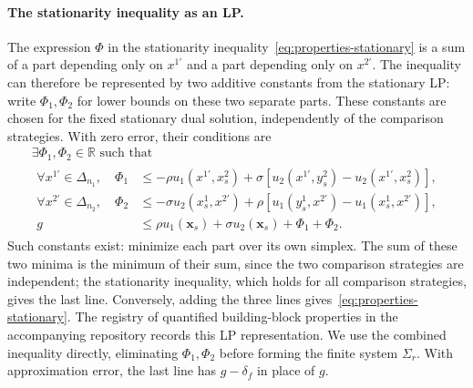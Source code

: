 \documentclass[11pt]{article}
\theoremstyle{remark}
\theoremstyle{plain}
\begin{document}
\paragraph{The stationarity inequality as an LP.}
The expression $\Phi$ in the stationarity
inequality~\eqref{eq:properties-stationary} is a sum of a part
depending only on $x^{1\prime}$ and a part depending only on
$x^{2\prime}$. The inequality can therefore be
represented by two additive constants from the stationary LP:
write $\Phi_1,\Phi_2$ for lower bounds on these two separate
parts. These constants are chosen for the fixed stationary dual
solution, independently of the comparison strategies. With zero
error, their conditions are
\begin{equation}
 \begin{gathered}
 \exists \Phi_1,\Phi_2\in\mathbb R\text{ such that}\\
 \begin{aligned}
 \forall x^{1\prime}\in\Delta_{n_1},\quad
 \Phi_1&\le-\rho u_1(x^{1\prime},x_s^2)
       +\sigma[u_2(x^{1\prime},y_s^2)-u_2(x^{1\prime},x_s^2)],\\
 \forall x^{2\prime}\in\Delta_{n_2},\quad
 \Phi_2&\le-\sigma u_2(x_s^1,x^{2\prime})
       +\rho[u_1(y_s^1,x^{2\prime})-u_1(x_s^1,x^{2\prime})],\\
 g&\le\rho u_1(\boldsymbol x_s)+\sigma u_2(\boldsymbol x_s)+\Phi_1+\Phi_2.
 \end{aligned}
 \end{gathered}
 \label{eq:stationary-lp-offsets}
\end{equation}
Such constants exist: minimize each part over its own
simplex. The sum of these two minima is the minimum of their sum,
since the two comparison strategies are independent; the
stationarity inequality, which holds for all comparison strategies,
gives the last line. Conversely, adding the
three lines gives~\eqref{eq:properties-stationary}.
The registry of quantified building-block properties in the
accompanying repository records this LP representation. We use the
combined inequality directly, eliminating $\Phi_1,\Phi_2$ before forming
the finite system $\Sigma_r$. With approximation error, the last
line has $g-\delta_f$ in place of $g$.
\end{document}
